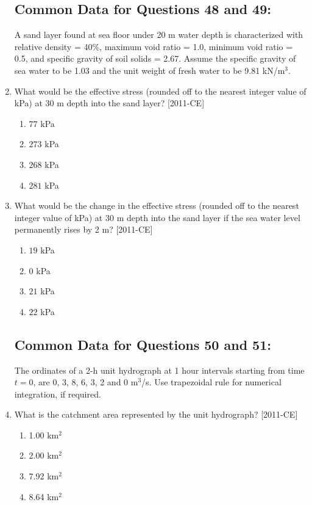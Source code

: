 \documentclass[journal,12pt,onecolumn]{IEEEtran}
\theoremstyle{remark}
\begin{document}
\begin{enumerate}
    \subsection*{Common Data for Questions 48 and 49:}
    A sand layer found at sea floor under 20 m water depth is characterized with relative density = 40\%, maximum void ratio = 1.0, minimum void ratio = 0.5, and specific gravity of soil solids = 2.67. Assume the specific gravity of sea water to be 1.03 and the unit weight of fresh water to be 9.81 kN/m$^3$.
    \item What would be the effective stress (rounded off to the nearest integer value of kPa) at 30 m depth into the sand layer? \hfill{[2011-CE]}
    \begin{enumerate}
        \item $77$ kPa
        \item $273$ kPa
        \item $268$ kPa
        \item $281$ kPa
    \end{enumerate}

    \item What would be the change in the effective stress (rounded off to the nearest integer value of kPa) at 30 m depth into the sand layer if the sea water level permanently rises by 2 m? \hfill{[2011-CE]}
    \begin{enumerate}
        \item $19$ kPa
        \item $0$ kPa
        \item $21$ kPa
        \item $22$ kPa
    \end{enumerate}

    \subsection*{Common Data for Questions 50 and 51:}
    The ordinates of a 2-h unit hydrograph at 1 hour intervals starting from time $t = 0$, are 0, 3, 8, 6, 3, 2 and 0 m$^3$/s. Use trapezoidal rule for numerical integration, if required.

    \item What is the catchment area represented by the unit hydrograph? \hfill{[2011-CE]}
    \begin{enumerate}
    \item 1.00 km$^2$
    \item 2.00 km$^2$
    \item 7.92 km$^2$
    \item 8.64 km$^2$
    \end{enumerate}


\end{enumerate}
\end{document}
